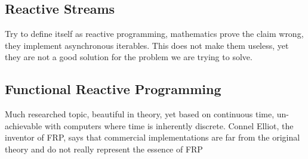 \subsection{Reactive Streams}
Try to define itself as reactive programming, mathematics prove the claim wrong, they implement asynchronous iterables. This does not make them useless, yet they are not a good solution for the problem we are trying to solve.


\subsection{Functional Reactive Programming}
\label{frp}
Much researched topic, beautiful in theory, yet based on continuous time, un-achievable with computers where time is inherently discrete. Connel Elliot, the inventor of FRP, says that commercial implementations are far from the original theory and do not really represent the essence of FRP
